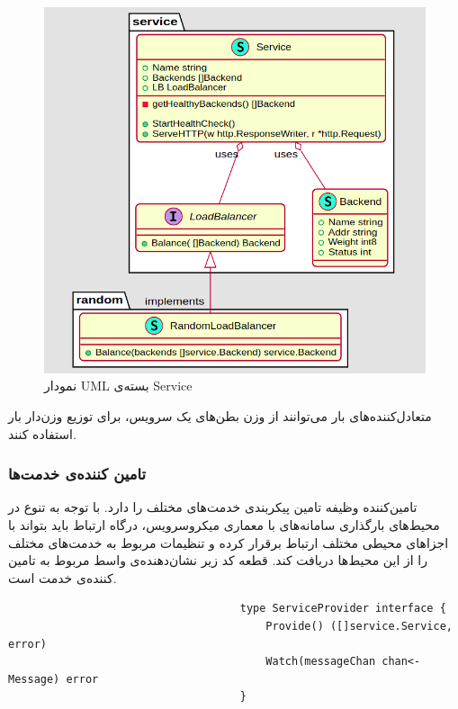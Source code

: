 \begin{figure}[H]
    \centering
    \label{service_package}
    \includegraphics[scale=0.2]{images/Loadbalance.png}
    \caption{نمودار UML بسته‌ی Service}
\end{figure}

متعادل‌کننده‌های بار می‌توانند از وزن بطن‌های یک سرویس، برای توزیع وزن‌دار بار استفاده‌ کنند.


\subsubsection{تامین کننده‌ی خدمت‌ها}
تامین‌کننده‌ وظیفه تامین پیکربندی‌ خدمت‌های مختلف را دارد. با توجه به تنوع در محیط‌های بارگذاری سامانه‌های با معماری میکروسرویس، درگاه ارتباط باید بتواند با اجزاهای محیطی مختلف ارتباط برقرار کرده و تنظیمات مربوط به خدمت‌های مختلف را از این محیط‌ها دریافت کند. قطعه کد زیر نشان‌دهنده‌ی واسط مربوط به تامین کننده‌ی خدمت است.

\begin{latin}
    \begin{lstlisting}
                                    type ServiceProvider interface {
                                        Provide() ([]service.Service, error)
                                        Watch(messageChan chan<- Message) error
                                    }
    \end{lstlisting}
\end{latin}

